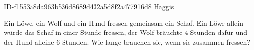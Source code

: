 \begin{exercise}
      {ID-f1553a8da963b536d8689d432a5d8f2a477916d8}
      {Haggis}
  \ifproblem\problem\par
    Ein Löwe, ein Wolf und ein Hund fressen gemeinsam ein Schaf. Ein Löwe allein
    würde das Schaf in einer Stunde fressen, der Wolf bräuchte 4 Stunden dafür
    und der Hund alleine 6 Stunden. Wie lange brauchen sie, wenn sie zusammen
    fressen?
  \fi
\end{exercise}
